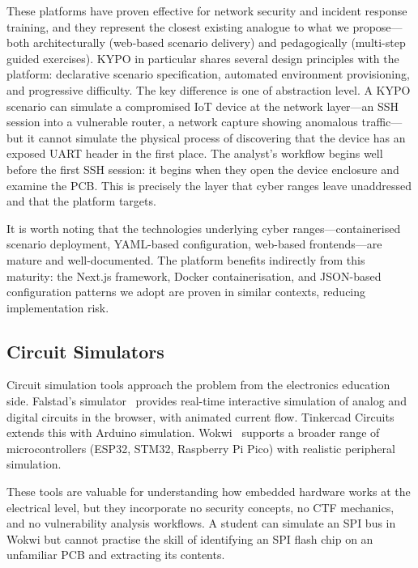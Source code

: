 These platforms have proven effective for network security and incident response training, and they represent the closest existing analogue to what we propose---both architecturally (web-based scenario delivery) and pedagogically (multi-step guided exercises). KYPO in particular shares several design principles with the \pcbctf{} platform: declarative scenario specification, automated environment provisioning, and progressive difficulty. The key difference is one of abstraction level. A KYPO scenario can simulate a compromised IoT device at the network layer---an SSH session into a vulnerable router, a network capture showing anomalous traffic---but it cannot simulate the physical process of discovering that the device has an exposed UART header in the first place. The analyst's workflow begins well before the first SSH session: it begins when they open the device enclosure and examine the PCB. This is precisely the layer that cyber ranges leave unaddressed and that the \pcbctf{} platform targets.

It is worth noting that the technologies underlying cyber ranges---containerised scenario deployment, YAML-based configuration, web-based frontends---are mature and well-documented. The \pcbctf{} platform benefits indirectly from this maturity: the Next.js framework, Docker containerisation, and JSON-based configuration patterns we adopt are proven in similar contexts, reducing implementation risk.

\subsection{Circuit Simulators}\label{subsec:circuit-sims}

Circuit simulation tools approach the problem from the electronics education side. Falstad's simulator~\cite{falstad} provides real-time interactive simulation of analog and digital circuits in the browser, with animated current flow. Tinkercad Circuits extends this with Arduino simulation. Wokwi~\cite{wokwi} supports a broader range of microcontrollers (ESP32, STM32, Raspberry Pi Pico) with realistic peripheral simulation.

These tools are valuable for understanding how embedded hardware works at the electrical level, but they incorporate no security concepts, no CTF mechanics, and no vulnerability analysis workflows. A student can simulate an SPI bus in Wokwi but cannot practise the skill of identifying an SPI flash chip on an unfamiliar PCB and extracting its contents.

